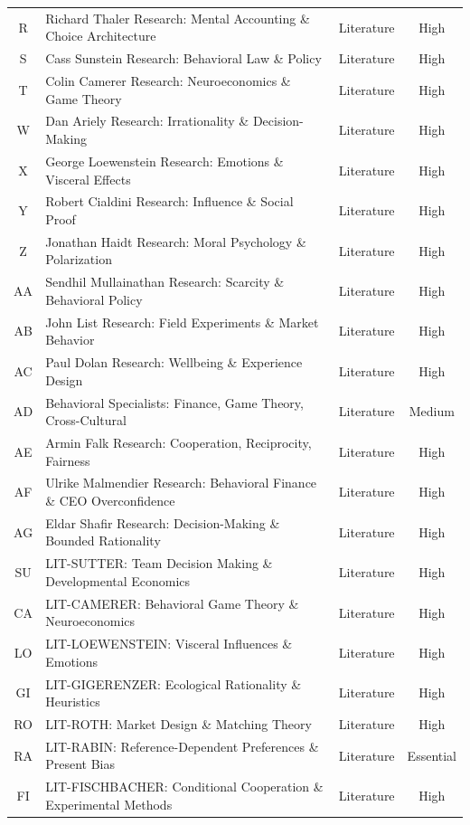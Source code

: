 \begin{table}[htbp]
\begin{tabular}{@{}cllc@{}}
R & Richard Thaler Research: Mental Accounting \& Choice Architecture & Literature & High \\
S & Cass Sunstein Research: Behavioral Law \& Policy & Literature & High \\
T & Colin Camerer Research: Neuroeconomics \& Game Theory & Literature & High \\
W & Dan Ariely Research: Irrationality \& Decision-Making & Literature & High \\
X & George Loewenstein Research: Emotions \& Visceral Effects & Literature & High \\
Y & Robert Cialdini Research: Influence \& Social Proof & Literature & High \\
Z & Jonathan Haidt Research: Moral Psychology \& Polarization & Literature & High \\
AA & Sendhil Mullainathan Research: Scarcity \& Behavioral Policy & Literature & High \\
AB & John List Research: Field Experiments \& Market Behavior & Literature & High \\
AC & Paul Dolan Research: Wellbeing \& Experience Design & Literature & High \\
AD & Behavioral Specialists: Finance, Game Theory, Cross-Cultural & Literature & Medium \\
AE & Armin Falk Research: Cooperation, Reciprocity, Fairness & Literature & High \\
AF & Ulrike Malmendier Research: Behavioral Finance \& CEO Overconfidence & Literature & High \\
AG & Eldar Shafir Research: Decision-Making \& Bounded Rationality & Literature & High \\
SU & LIT-SUTTER: Team Decision Making \& Developmental Economics & Literature & High \\
CA & LIT-CAMERER: Behavioral Game Theory \& Neuroeconomics & Literature & High \\
LO & LIT-LOEWENSTEIN: Visceral Influences \& Emotions & Literature & High \\
GI & LIT-GIGERENZER: Ecological Rationality \& Heuristics & Literature & High \\
RO & LIT-ROTH: Market Design \& Matching Theory & Literature & High \\
RA & LIT-RABIN: Reference-Dependent Preferences \& Present Bias & Literature & Essential \\
FI & LIT-FISCHBACHER: Conditional Cooperation \& Experimental Methods & Literature & High \\

\end{tabular}
\end{table}
